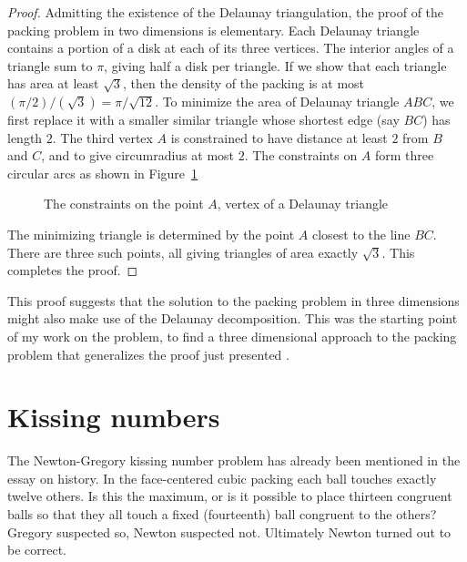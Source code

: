 \begin{proof}
Admitting the existence of the Delaunay triangulation, the proof 
of the packing problem in two dimensions is
elementary.  Each Delaunay triangle contains a portion of a disk at each of
its three vertices.  The interior angles of a triangle sum to $\pi$, giving
half a disk per triangle.  If we show that each triangle has area at least
$\sqrt{3}$, then the density of the packing is at most
 $(\pi/2)/(\sqrt{3}) = \pi/\sqrt{12}$.  To minimize the area of Delaunay
triangle $ABC$, we first replace it with a smaller similar triangle whose
shortest edge (say $BC$) has length $2$.  The third vertex $A$ is constrained
to have distance at least $2$ from $B$ and $C$, and to give circumradius at most $2$.  The constraints on $A$ form three circular
arcs as shown in Figure~\ref{fig:2D-FT} %

\begin{figure}[htb]
  \centering
  \caption{The constraints on the point $A$, vertex of a Delaunay triangle}
  \label{fig:2D-FT}
\end{figure}

The minimizing triangle is determined by the point $A$ closest to the
line $BC$.  There are three such points, all giving triangles of area
exactly $\sqrt3$.  This completes the proof.
\end{proof}

This proof suggests that the solution to the packing problem
in three dimensions might also make use of the Delaunay
decomposition.  This was the starting point of my work on the
problem, to find a three dimensional approach to the packing
problem that generalizes the proof just presented \cite{remarks}.



\clearpage




\section{Kissing numbers}\label{sec:13s}

The Newton-Gregory kissing number problem has already been 
mentioned in the essay on
history.  In the face-centered cubic packing each ball touches exactly twelve
others.  Is this the maximum, 
or is it possible to place thirteen congruent balls so that they
all touch a fixed (fourteenth) ball congruent to the others?
Gregory suspected so, Newton suspected not.  Ultimately Newton turned
out to be correct. 


